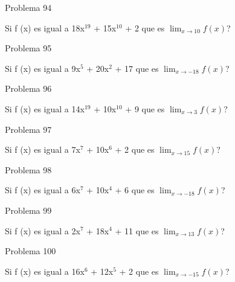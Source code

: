 \documentclass{article}
\begin{document}
Problema 94

Si f (x) es igual a 18x$^{19}$ +  15x${^10}$ + 2 que es $\lim_{x\to 10} f(x) $?

Problema 95

Si f (x) es igual a 9x$^{5}$ +  20x${^2}$ + 17 que es $\lim_{x\to -18} f(x) $?

Problema 96

Si f (x) es igual a 14x$^{19}$ +  10x${^10}$ + 9 que es $\lim_{x\to 3} f(x) $?

Problema 97

Si f (x) es igual a 7x$^{7}$ +  10x${^6}$ + 2 que es $\lim_{x\to 15} f(x) $?

Problema 98

Si f (x) es igual a 6x$^{7}$ +  10x${^4}$ + 6 que es $\lim_{x\to -18} f(x) $?

Problema 99

Si f (x) es igual a 2x$^{7}$ +  18x${^4}$ + 11 que es $\lim_{x\to 13} f(x) $?

Problema 100

Si f (x) es igual a 16x$^{6}$ +  12x${^5}$ + 2 que es $\lim_{x\to -15} f(x) $?
\end{document}
